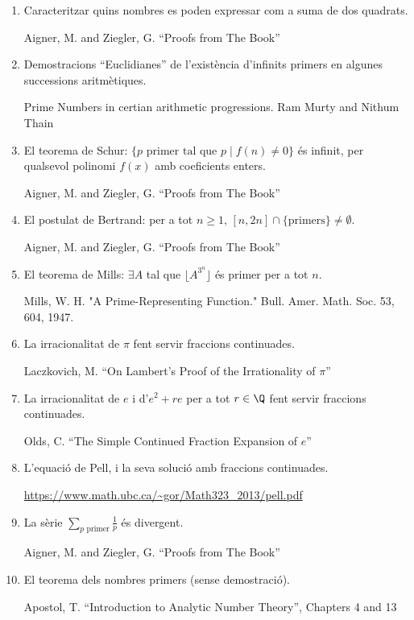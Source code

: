 \begin{enumerate}
\item Caracteritzar quins nombres es poden expressar com a suma de dos quadrats.

  {\tiny Aigner, M. and Ziegler, G. ``Proofs from The Book''}


\item Demostracions ``Euclidianes'' de l'existència d'infinits primers en algunes successions aritmètiques.

  {\tiny Prime Numbers in certian arithmetic progressions. Ram Murty and Nithum Thain}

\item El teorema de Schur: $\{p\text{ primer tal que } p \mid f(n)\neq 0\}$ és infinit, per qualsevol polinomi $f(x)$ amb coeficients enters.

  {\tiny Aigner, M. and Ziegler, G. ``Proofs from The Book''}
\item El postulat de Bertrand: per a tot $n\geq 1$, $[n,2n]\cap \{\text{primers}\}\neq\emptyset$.

  {\tiny Aigner, M. and Ziegler, G. ``Proofs from The Book''}
\item El teorema de Mills: $\exists A$ tal que $\lfloor A^{3^n}\rfloor$ és primer per a tot $n$.

  {\tiny Mills, W. H. "A Prime-Representing Function." Bull. Amer. Math. Soc. 53, 604, 1947.}
\item La irracionalitat de $\pi$ fent servir fraccions continuades.

  {\tiny Laczkovich, M. ``On Lambert's Proof of the Irrationality of $\pi$''}
 \item La irracionalitat de $e$ i d'$e^2+re$ per a tot $r\in\Q$ fent servir fraccions continuades.

   {\tiny Olds, C. ``The Simple Continued Fraction Expansion of $e$''}
 \item L'equació de Pell, i la seva solució amb fraccions continuades.

   {\tiny \url{https://www.math.ubc.ca/~gor/Math323_2013/pell.pdf}}
\item La sèrie $\displaystyle\sum_{p\text{ primer}} \frac 1 p$ és divergent.

  {\tiny Aigner, M. and Ziegler, G. ``Proofs from The Book''}

\item El teorema dels nombres primers (sense demostració).

  {\tiny Apostol, T. ``Introduction to Analytic Number Theory'', Chapters 4 and 13}


\end{enumerate}
